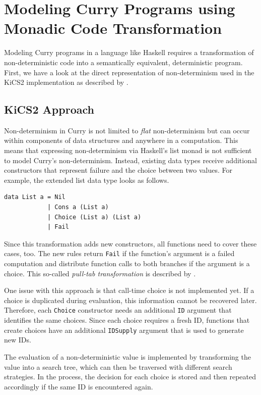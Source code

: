 \documentclass[a4paper, 11pt, fleqn, twoside, abstract=on]{scrreprt}
\newcommand{\hinl}[1]{\texttt{#1}}
\begin{document}
\section{Modeling Curry Programs using Monadic Code Transformation}

Modeling Curry programs in a language like Haskell requires a transformation of non-deterministic code into a semantically equivalent, deterministic program.
First, we have a look at the direct representation of non-determinism used in the KiCS2 implementation as described by \citet{brassel2011kics2}.

\subsection{KiCS2 Approach}
\label{subsec:kics2}
Non-determinism in Curry is not limited to \textit{flat} non-determinism but can occur within components of data structures and anywhere in a computation.
This means that expressing non-determinism via Haskell's list monad is not sufficient to model Curry's non-determinism.
Instead, existing data types receive additional constructors that represent failure and the choice between two values.
For example, the extended list data type looks as follows.

\begin{verbatim}
data List a = Nil 
            | Cons a (List a) 
            | Choice (List a) (List a) 
            | Fail
\end{verbatim}
\noindent
Since this transformation adds new constructors, all functions need to cover these cases, too.
The new rules return \hinl{Fail} if the function's argument is a failed computation and distribute function calls to both branches if the argument is a choice.
This so-called \textit{pull-tab transformation} is described by \citet{alqaddoumi2010ThePT}.

One issue with this approach is that call-time choice is not implemented yet.
If a choice is duplicated during evaluation, this information cannot be recovered later.
Therefore, each \hinl{Choice} constructor needs an additional \hinl{ID} argument that identifies the same choices.
Since each choice requires a fresh ID, functions that create choices have an additional \hinl{IDSupply} argument that is used to generate new IDs.

The evaluation of a non-deterministic value is implemented by transforming the value into a search tree, which can then be traversed with different search strategies.
In the process, the decision for each choice is stored and then repeated accordingly if the same ID is encountered again.
\end{document}
